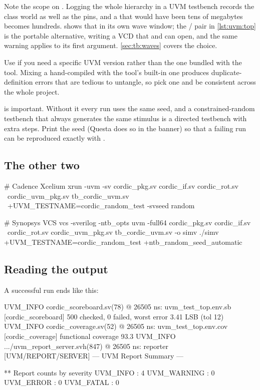 Note the scope on . Logging the whole hierarchy in a UVM testbench
records the class world as well as the pins, and a  that would have
been tens of megabytes becomes hundreds.  shows that
 in its own wave window; the /
pair in \cref{lst:uvm:top} is the portable alternative, writing a VCD that
 and  can open, and the same warning applies to its
first argument. \cref{sec:tb:waves} covers the choice.

Use  if you need a specific UVM version rather than the
one bundled with the tool. Mixing a hand-compiled  with the
tool's built-in one produces duplicate-definition errors that are tedious to
untangle, so pick one and be consistent across the whole project.

 is important. Without it every run uses the same
seed, and a constrained-random testbench that always generates the same
stimulus is a directed testbench with extra steps. Print the seed (Questa
does so in the banner) so that a failing run can be reproduced exactly with
.

\subsection{The other two}

\begin{shcode}
# Cadence Xcelium
xrun -uvm -sv cordic_pkg.sv cordic_if.sv cordic_rot.sv \
     cordic_uvm_pkg.sv tb_cordic_uvm.sv \
     +UVM_TESTNAME=cordic_random_test -svseed random

# Synopsys VCS
vcs -sverilog -ntb_opts uvm -full64 cordic_pkg.sv cordic_if.sv \
    cordic_rot.sv cordic_uvm_pkg.sv tb_cordic_uvm.sv -o simv
./simv +UVM_TESTNAME=cordic_random_test +ntb_random_seed_automatic
\end{shcode}

\subsection{Reading the output}

A successful run ends like this:

\begin{txtcode}
UVM_INFO cordic_scoreboard.sv(78) @ 26505 ns:
  uvm_test_top.env.sb [cordic_scoreboard]
  500 checked, 0 failed, worst error 3.41 LSB (tol 12)
UVM_INFO cordic_coverage.sv(52) @ 26505 ns:
  uvm_test_top.env.cov [cordic_coverage]
  functional coverage 93.3 %
UVM_INFO .../uvm_report_server.svh(847) @ 26505 ns:
  reporter [UVM/REPORT/SERVER]
--- UVM Report Summary ---

** Report counts by severity
UVM_INFO :    4
UVM_WARNING : 0
UVM_ERROR :   0
UVM_FATAL :   0
\end{txtcode}


